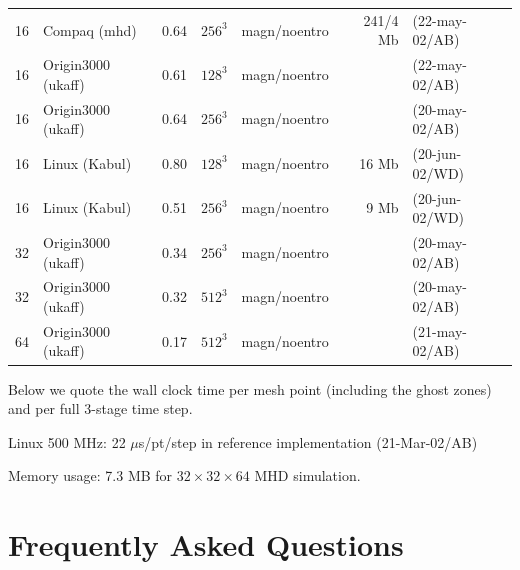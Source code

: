 \documentclass[12pt,twoside,notitlepage,a4paper]{article}
\begin{document}
\begin{table}[htb]
\begin{center}
\begin{small}
\begin{tabular}{rllrlrl}
16    & Compaq (mhd)      & 0.64 & $256^3$ & magn/noentro &241/4 Mb& (22-may-02/AB)\\
16    & Origin3000 (ukaff)& 0.61 & $128^3$ & magn/noentro &        & (22-may-02/AB)\\
16    & Origin3000 (ukaff)& 0.64 & $256^3$ & magn/noentro &        & (20-may-02/AB)\\
16    & Linux (Kabul)     & 0.80 & $128^3$ & magn/noentro &  16 Mb & (20-jun-02/WD)\\
16    & Linux (Kabul)     & 0.51 & $256^3$ & magn/noentro &   9 Mb & (20-jun-02/WD)\\
32    & Origin3000 (ukaff)& 0.34 & $256^3$ & magn/noentro &        & (20-may-02/AB)\\
32    & Origin3000 (ukaff)& 0.32 & $512^3$ & magn/noentro &        & (20-may-02/AB)\\
64    & Origin3000 (ukaff)& 0.17 & $512^3$ & magn/noentro &        & (21-may-02/AB)\\
      \end{tabular}
    \end{small}
  \end{center}
\end{table}

Below we quote the wall clock time per mesh point (including the ghost zones)
and per full 3-stage time step.

Linux 500 MHz: 22 $\mu$s/pt/step in reference implementation (21-Mar-02/AB)

Memory usage: 7.3 MB for $32\times32\times64$ MHD simulation.




\section{Frequently Asked Questions}
\end{document}
